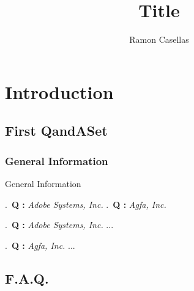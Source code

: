 \documentclass[pdftex,english,a4paper,10pt]{article}
\title{Title}
\author{Ramon Casellas}
\begin{document}
\maketitle

\section{Introduction}
\label{id2783543}\hypertarget{id2783543}{}%
\subsection*{First QandASet}
\label{id2720185}
\subsubsection*{General Information}
\label{id2708302}
\begin{qandadivtoc}
\caption{General Information}
.~{\bf Q : }{\em Adobe Systems, Inc.} \newline
{}.~{\bf Q : }{\em Agfa, Inc.} \newline
\end{qandadivtoc}
\vspace{0.25cm}
.~{\bf Q : }{\em Adobe Systems, Inc.} \newline
{}...\newline
\vspace{0.25cm}


.~{\bf Q : }{\em Agfa, Inc.} \newline
{}...\newline
\vspace{0.25cm}


\subsection*{F.A.Q.}
\label{id2720265}
\end{document}
